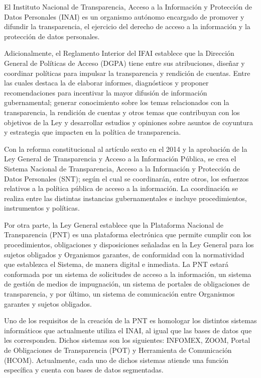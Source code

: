 El Instituto Nacional de Transparencia, Acceso a la Información y Protección de Datos Personales (INAI) es un organismo autónomo encargado de promover y difundir la transparencia, el ejercicio del derecho de acceso a la información y la protección de datos personales.

Adicionalmente, el Reglamento Interior del IFAI establece que la Dirección General de Políticas de Acceso (DGPA) tiene entre sus atribuciones, diseñar y coordinar políticas para impulsar la transparencia y rendición de cuentas. Entre las cuales destaca la de elaborar informes, diagnósticos y proponer recomendaciones para incentivar la mayor difusión de información gubernamental; generar conocimiento sobre los temas relacionados con la transparencia, la rendición de cuentas y otros temas que contribuyan con los objetivos de la Ley y desarrollar estudios y opiniones sobre asuntos de coyuntura y estrategia que impacten en la política de transparencia.

Con la reforma constitucional al artículo sexto en el 2014 y la aprobación de la Ley General de Transparencia y Acceso a la Información Pública, se crea el Sistema Nacional de Transparencia, Acceso a la Información y Protección de Datos Personales (SNT); según el cual se coordinarán, entre otros, los esfuerzos relativos a la  política pública de acceso a la información. La coordinación se realiza entre las distintas instancias gubernamentales e incluye procedimientos, instrumentos y políticas.

Por otra parte, la Ley General establece que la Plataforma Nacional de Transparencia (PNT) es una plataforma electrónica que permite cumplir con los procedimientos, obligaciones y disposiciones señaladas en la Ley General para los sujetos obligados y Organismos garantes, de conformidad con la normatividad que establezca el Sistema, de manera digital e inmediata. La PNT estará conformada por un sistema de solicitudes de acceso a la información, un sistema de gestión de medios de impugnación, un sistema de portales de obligaciones de transparencia, y por último, un sistema de comunicación entre Organismos garantes y sujetos obligados.

Uno de los requisitos de la creación de la PNT es homologar los distintos sistemas informáticos que actualmente utiliza el INAI, al igual que las bases de datos que les corresponden. Dichos sistemas son los siguientes: INFOMEX, ZOOM, Portal de Obligaciones de Transparencia (POT) y Herramienta de Comunicación (HCOM). Actualmente, cada uno de dichos sistemas atiende una función específica y cuenta con bases de datos segmentadas. 

